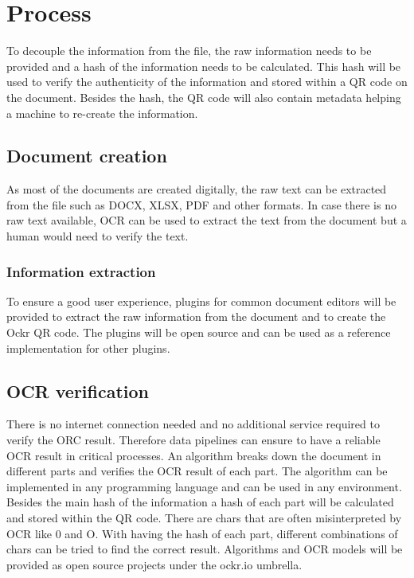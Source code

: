 \documentclass[../ockr-specification.tex]{subfiles}
\begin{document}
\section{Process}

To decouple the information from the file, the raw information needs to be provided and a hash of the information needs to be calculated. This hash will be used to verify the authenticity of the information and stored within a QR code on the document. Besides the hash, the QR code will also contain metadata helping a machine to re-create the information.

\subsection{Document creation}

As most of the documents are created digitally, the raw text can be extracted from the file such as DOCX, XLSX, PDF and other formats. In case there is no raw text available, OCR can be used to extract the text from the document but a human would need to verify the text.

\subsubsection{Information extraction}

To ensure a good user experience, plugins for common document editors will be provided to extract the raw information from the document and to create the Ockr QR code. The plugins will be open source and can be used as a reference implementation for other plugins.

\subsection{OCR verification}

There is no internet connection needed and no additional service required to verify the ORC result. Therefore data pipelines can ensure to have a reliable OCR result in critical processes. An algorithm breaks down the document in different parts and verifies the OCR result of each part. The algorithm can be implemented in any programming language and can be used in any environment. Besides the main hash of the information a hash of each part will be calculated and stored within the QR code. There are chars that are often misinterpreted by OCR like 0 and O. With having the hash of each part, different combinations of chars can be tried to find the correct result. Algorithms and OCR models will be provided as open source projects under the ockr.io umbrella. 
\end{document}
